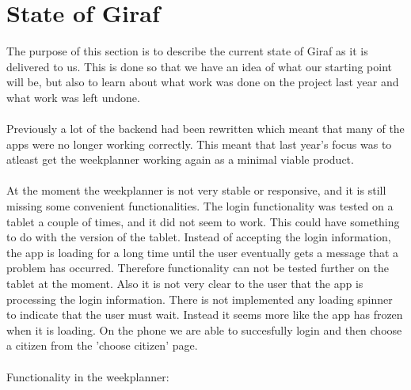 \section{State of Giraf}
The purpose of this section is to describe the current state of Giraf as it is delivered to us. 
This is done so that we have an idea of what our starting point will be,
but also to learn about what work was done on the project last year and what work was left undone. 
\\\\
Previously a lot of the backend had been rewritten which meant that many of the apps were no longer working correctly. 
This meant that last year's focus was to atleast get the weekplanner working again as a minimal viable product.
\\\\
At the moment the weekplanner is not very stable or responsive, and it is still missing some convenient functionalities. The login functionality was tested on a tablet a couple of times, and it did not seem to work. This could have something to do with the version of the tablet.
Instead of accepting the login information, the app is loading for a long time until the user eventually gets a message that a problem has occurred. 
Therefore functionality can not be tested further on the tablet at the moment. Also it is not very clear to the user that the app is processing the login information. 
There is not implemented any loading spinner to indicate that the user must wait. Instead it seems more like the app has frozen when it is loading.
On the phone we are able to succesfully login and then choose a citizen from the 'choose citizen' page.
\\\\
Functionality in the weekplanner:
